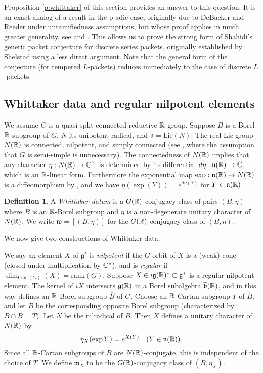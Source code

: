 \documentclass{article}
\theoremstyle{definition}
\newtheorem{dfn}[thm]{Definition}
\numberwithin{equation}{section}
\renewcommand{\-}{\hyp{}}
\newcommand{\n}{\mathfrak n}
\newcommand{\g}{\mathfrak g}
\newcommand{\w}{\mathfrak w}
\newcommand{\Cent}{\mathrm{Cent}}
\begin{document}
Proposition \ref{p:whittaker} of this section provides an answer to this question. It is an exact analog of a result in the p-adic case, originally due to DeBacker and Reeder \cite[Proposition 4.10]{DR10} under unramifiedness assumptions, but whose proof applies in much greater generality, see \cite[Lemma 6.2.2]{KalRSP} and \cite[\S4.4]{FKS}. This allows us to prove the strong form of Shahidi's generic packet conjecture \cite[\S9]{Sha90} for discrete series packets, originally established by Shelstad \cite{SheTE3} using a less direct argument. Note that the general form of the conjecture (for tempered $L$\-packets) reduces immediately to the case of discrete $L$\-packets.

\subsection{Whittaker data and regular nilpotent elements} \label{sub:whit}

We assume  $G$ is a quasi-split connected reductive
$\mathbb{R}$-group. Suppose $B$ is a Borel $\mathbb{R}$-subgroup of $G$, $N$ its
unipotent radical, and $\n=\mathrm{Lie}(N)$.
The real Lie group $N(\mathbb{R})$ is connected, nilpotent,
and simply connected (see \cite[Theorem 6.46]{KnappLie}, where the assumption that $G$ is semi-simple is unnecessary). The connectedness of $N(\mathbb{R})$ implies that any character $\eta : N(\mathbb{R}) \to \mathbb{C}^\times$ is determined by its differential $d\eta : \n(\R) \to \C$, which is an $\mathbb{R}$-linear form. Furthermore the exponential map $\exp : \n(\R) \to N(\R)$ is a diffeomorphism by \cite[Theorem 1.127]{KnappLie}, and we have $\eta(\exp(Y))=e^{d\eta (Y)}$ for $Y \in \n(\R)$. 


\begin{dfn} \label{dfn:whit}
A  \emph{Whittaker datum} is a $G(\mathbb{R})$-conjugacy class of  pairs  $(B,\eta)$ where $B$ is an $\mathbb{R}$-Borel subgroup
	and $\eta$ is a non-degenerate unitary character of $N(\mathbb{R})$. We  write $\w=[(B,\eta)]$ for the $G(\mathbb{R})$-conjugacy class of $(B,\eta)$. 		
\end{dfn}

We  now give two constructions of Whittaker data.

We say an element $X$ of $\g^*$ is \emph{nilpotent} if the $G$-orbit of $X$
is a (weak) cone (closed under multiplication by $\mathbb{C}^*$), and is
\emph{regular} if $\dim_{\Cent(G)}(X)=\mathrm{rank}(G)$.  Suppose
$X\in i\g(\R)^*\subset \g^*$ is a regular nilpotent element.  The
kernel of $iX$ intersects $\g(\R)$ in a Borel subalgebra $\overline{\mathfrak b}(\mathbb{R})$, and in this way defines an $\mathbb{R}$-Borel subgroup $\overline B$ of $G$.
Choose an $\mathbb{R}$-Cartan subgroup $T$ of
$\overline B$, and let $B$ be the corresponding opposite Borel
subgroup (characterized by $B\cap \overline B=T$). 
Let $N$ be the nilradical of $B$.  Then $X$ defines a unitary
character of $N(\mathbb{R})$ by
\[ 
\eta_X(\exp Y)=e^{X(Y)}\quad (Y\in\n(\R)).
\] 
Since all $\mathbb{R}$-Cartan subgroups of $B$ are $N(\mathbb{R})$-conjugate,
\cite[Theorem 19.2]{Bor91} this is independent of the choice of $T$. We define $\w_X$ to be the $G(\mathbb{R})$-conjugacy class of $(B,\eta_X)$. 
\end{document}
